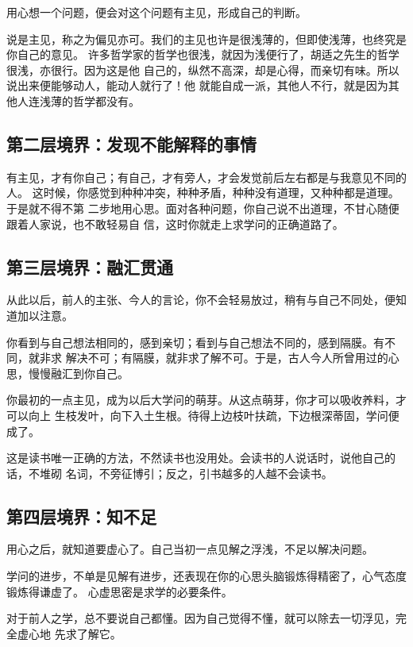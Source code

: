 \documentclass[11pt]{ctexart}
\begin{document}
{{{{用心想一个问题，便会对这个问题有主见，形成自己的判断。

说是主见，称之为偏见亦可。我们的主见也许是很浅薄的，但即使浅薄，也终究是你自己的意见。
许多哲学家的哲学也很浅，就因为浅便行了，胡适之先生的哲学很浅，亦很行。因为这是他
自己的，纵然不高深，却是心得，而亲切有味。所以说出来便能够动人，能动人就行了！他
就能自成一派，其他人不行，就是因为其他人连浅薄的哲学都没有。

\subsection{第二层境界：发现不能解释的事情}
\label{sec:orgccbd8ea}

有主见，才有你自己；有自己，才有旁人，才会发觉前后左右都是与我意见不同的人。
这时候，你感觉到种种冲突，种种矛盾，种种没有道理，又种种都是道理。于是就不得不第
二步地用心思。面对各种问题，你自己说不出道理，不甘心随便跟着人家说，也不敢轻易自
信，这时你就走上求学问的正确道路了。

\subsection{第三层境界：融汇贯通}
\label{sec:orgb122e33}

从此以后，前人的主张、今人的言论，你不会轻易放过，稍有与自己不同处，便知道加以注意。

你看到与自己想法相同的，感到亲切；看到与自己想法不同的，感到隔膜。有不同，就非求
解决不可；有隔膜，就非求了解不可。于是，古人今人所曾用过的心思，慢慢融汇到你自己。

你最初的一点主见，成为以后大学问的萌芽。从这点萌芽，你才可以吸收养料，才可以向上
生枝发叶，向下入土生根。待得上边枝叶扶疏，下边根深蒂固，学问便成了。

这是读书唯一正确的方法，不然读书也没用处。会读书的人说话时，说他自己的话，不堆砌
名词，不旁征博引；反之，引书越多的人越不会读书。

\subsection{第四层境界：知不足}
\label{sec:org054a2af}

用心之后，就知道要虚心了。自己当初一点见解之浮浅，不足以解决问题。

学问的进步，不单是见解有进步，还表现在你的心思头脑锻炼得精密了，心气态度锻炼得谦虚了。
心虚思密是求学的必要条件。

对于前人之学，总不要说自己都懂。因为自己觉得不懂，就可以除去一切浮见，完全虚心地
先求了解它。

}}}}
\end{document}
